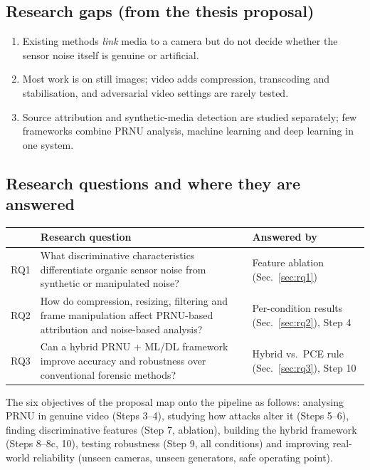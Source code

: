 \documentclass[11pt,a4paper]{article}
\begin{document}
\subsection{Research gaps (from the thesis proposal)}
\begin{enumerate}[label=\textbf{Gap \arabic*:},leftmargin=45pt]
\item Existing methods \emph{link} media to a camera but do not decide whether the sensor noise itself is genuine or artificial.
\item Most work is on still images; video adds compression, transcoding and stabilisation, and adversarial video settings are
      rarely tested.
\item Source attribution and synthetic-media detection are studied separately; few frameworks combine PRNU analysis, machine
      learning and deep learning in one system.
\end{enumerate}

\subsection{Research questions and where they are answered}
\begin{table}[H]\centering\small
\begin{tabularx}{\linewidth}{lYl}\toprule
& Research question & Answered by \\\midrule
RQ1 & What discriminative characteristics differentiate organic sensor noise from synthetic or manipulated noise? &
      Feature ablation (Sec.~\ref{sec:rq1}) \\
RQ2 & How do compression, resizing, filtering and frame manipulation affect PRNU-based attribution and noise-based analysis? &
      Per-condition results (Sec.~\ref{sec:rq2}), Step 4 \\
RQ3 & Can a hybrid PRNU + ML/DL framework improve accuracy and robustness over conventional forensic methods? &
      Hybrid vs.\ PCE rule (Sec.~\ref{sec:rq3}), Step 10 \\\bottomrule
\end{tabularx}\end{table}
The six objectives of the proposal map onto the pipeline as follows: analysing PRNU in genuine video (Steps 3--4), studying
how attacks alter it (Steps 5--6), finding discriminative features (Step 7, ablation), building the hybrid framework
(Steps 8--8c, 10), testing robustness (Step 9, all conditions) and improving real-world reliability (unseen cameras,
unseen generators, safe operating point).
\end{document}
